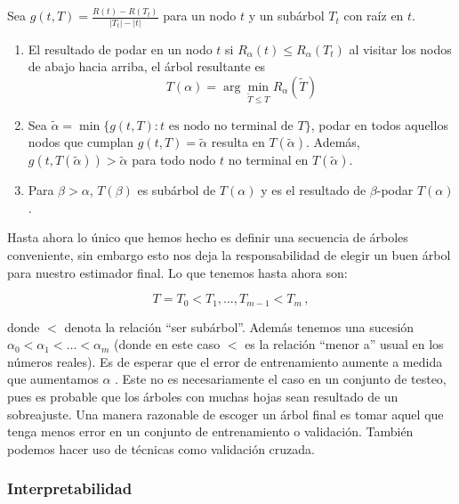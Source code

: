 \begin{lemma}

    Sea $g(t,T) = \frac{R(t) - R(T_t)}{|T_t| - |t|}$ para un nodo $t$ y un subárbol $T_t$ con raíz en $t$.
    \begin{enumerate}
        \item El resultado de podar en un nodo $t$ si $R_\alpha(t) \leq R_\alpha(T_t)$ al visitar los nodos de abajo hacia arriba, el árbol resultante es
        \begin{equation}
            T(\alpha) = \arg\min_{\tilde T \leq T} R_\alpha(\tilde T)
        \end{equation}

        \item Sea $\tilde \alpha = \min \{ g(t,T) :t \text{ es nodo no terminal de } T \} $, podar en todos aquellos nodos que cumplan $g(t,T) = \tilde \alpha$ resulta en $T(\tilde \alpha)$. Además, $g(t, T(\tilde \alpha)) > \tilde \alpha$ para todo nodo $t$ no terminal en $T(\tilde \alpha)$.

        \item Para $\beta > \alpha$, $T(\beta)$ es subárbol de $T(\alpha)$ y es el resultado de $\beta$-podar $T(\alpha)$.
    \end{enumerate}
\end{lemma}

Hasta ahora lo único que hemos hecho es definir una secuencia de árboles conveniente, sin embargo esto nos deja la responsabilidad de elegir un buen árbol para nuestro estimador final. Lo que tenemos hasta ahora son:

\begin{equation}
    T = T_0 < T_1, \dots, T_{m-1} < T_m \,,
\end{equation}

donde $<$ denota la relación ``ser subárbol''. Además tenemos una sucesión $\alpha_0 < \alpha_1 < \dots < \alpha_m$ (donde en este caso $<$ es la relación ``menor a'' usual en los números reales). Es de esperar que el error de entrenamiento aumente a medida que aumentamos $\alpha$ . Este no es necesariamente el caso en un conjunto de testeo, pues es probable que los árboles con muchas hojas sean resultado de un sobreajuste. Una manera razonable de escoger un árbol final es tomar aquel que tenga menos error en un conjunto de entrenamiento o validación. También podemos hacer uso de técnicas como validación cruzada.


\subsubsection{Interpretabilidad}

